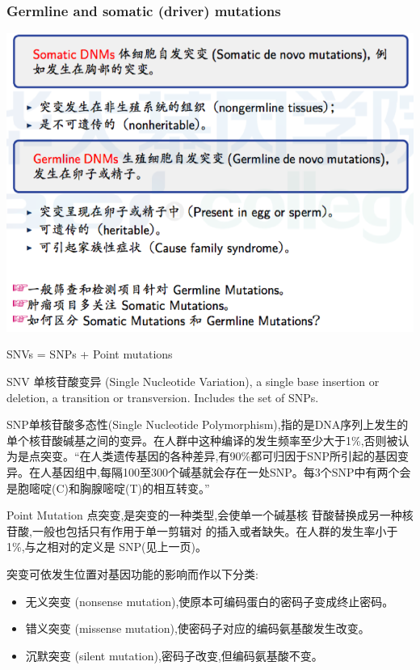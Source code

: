 \documentclass[12pt]{beamer}
\begin{document}
\begin{frame}\frametitle{Germline and somatic (driver) mutations}
    \includegraphics[width=\textwidth]{figures/old_slides/vartype.png}
  \end{frame}


\begin{frame}%
  \begin{center}
    {  \large  SNVs = SNPs + Point mutations}
  \end{center}
  {\small
\begin{tcolorbox}[colback=backg!5,colframe=backg,title=SNV]
  SNV 单核苷酸变异 (Single Nucleotide Variation), a single base insertion or deletion, a transition or transversion. Includes the set of SNPs.
\end{tcolorbox}
\begin{tcolorbox}[colback=backg!5,colframe=backg,title=SNP]
  SNP单核苷酸多态性(Single Nucleotide Polymorphism),指的是DNA序列上发生的单个核苷酸碱基之间的变异。在人群中这种编译的发生频率至少大于1\%,否则被认为是点突变。“在人类遗传基因的各种差异,有90\%都可归因于SNP所引起的基因变异。在人基因组中,每隔100至300个碱基就会存在一处SNP。每3个SNP中有两个会是胞嘧啶(C)和胸腺嘧啶(T)的相互转变。”
  \end{tcolorbox}
  }

\end{frame}

\begin{frame}
  \begin{tcolorbox}[colback=backg!5,colframe=backg,title=Point mutations]
   Point Mutation 点突变,是突变的一种类型,会使单一个碱基核 苷酸替换成另一种核苷酸,一般也包括只有作用于单一剪辑对 的插入或者缺失。在人群的发生率小于 1\%,与之相对的定义是 SNP(见上一页)。
  \end{tcolorbox}
  突变可依发生位置对基因功能的影响而作以下分类:
  \begin{itemize}
  \item 无义突变 (nonsense mutation),使原本可编码蛋白的密码子变成终止密码。
  \item 错义突变 (missense mutation),使密码子对应的编码氨基酸发生改变。
  \item 沉默突变 (silent mutation),密码子改变,但编码氨基酸不变。
  \end{itemize}
\end{frame}
\end{document}
